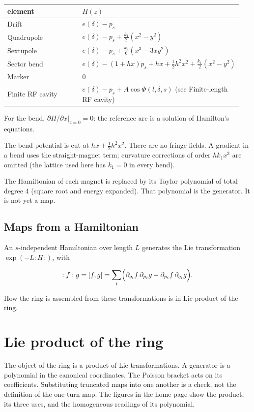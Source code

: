 \documentclass[11pt,a4paper]{article}
\begin{document}
\begin{center}\small\begin{tabular}{p{0.475\linewidth}p{0.475\linewidth}}\hline
\textbf{element} & \textbf{$H(z)$}\\\hline
Drift & $e(\delta)-p_s$\\
Quadrupole & $e(\delta)-p_s+\tfrac{k_1}{2}(x^2-y^2)$\\
Sextupole & $e(\delta)-p_s+\tfrac{k_2}{6}(x^3-3xy^2)$\\
Sector bend & $e(\delta)-(1+hx)p_s+hx+\tfrac12 h^2 x^2+\tfrac{k_1}{2}(x^2-y^2)$\\
Marker & $0$\\
Finite RF cavity & $e(\delta)-p_s+A\cos\Phi(l,\delta,s)$ (see Finite-length RF cavity)\\
\hline\end{tabular}\end{center}

For the bend, $\partial H/\partial x|_{z=0}=0$: the reference arc is a
solution of Hamilton's equations.

The bend potential is cut at $hx+\tfrac12 h^2 x^2$. There are no fringe
fields. A gradient in a bend uses the straight-magnet term; curvature
corrections of order $h k_1 x^3$ are omitted (the lattice used here has
$k_1=0$ in every bend).

The Hamiltonian of each magnet is replaced by its Taylor polynomial of
total degree 4 (square root and energy expanded). That polynomial is the
generator. It is not yet a map.

\subsection{Maps from a Hamiltonian}

An $s$-independent Hamiltonian over length $L$ generates the Lie
transformation $\exp(-L:H:)$, with

\[
:f:g=[f,g]=\sum_i\Bigl(\partial_{q_i}f\,\partial_{p_i}g-\partial_{p_i}f\,\partial_{q_i}g\Bigr).
\]

How the ring is assembled from these transformations is in
Lie product of the ring.
\clearpage
\section{Lie product of the ring}

The object of the ring is a product of Lie transformations. A generator is a
polynomial in the canonical coordinates. The Poisson bracket acts on its
coefficients. Substituting truncated maps into one another is a check, not
the definition of the one-turn map. The figures in the home page
show the product, its three uses, and the homogeneous readings of its
polynomial.
\end{document}
